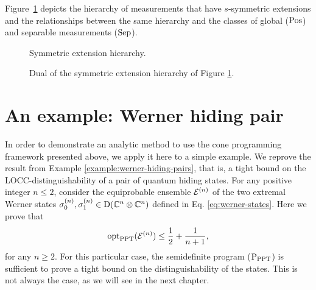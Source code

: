 Figure~\ref{fig:symm-extension} depicts the hierarchy of measurements that have
$s$-symmetric extensions and the relationships between the same hierarchy
and the classes of global ($\mathrm{Pos}$) and separable measurements ($\mathrm{Sep}$). 

\begin{figure}[!htbp]
  \centering
    \def\svgwidth{200pt}
    \scalebox{.85}{
    }
    \caption{Symmetric extension hierarchy.}
    \label{fig:symm-extension}
\end{figure}

\begin{figure}[!htbp]
  \centering
    \def\svgwidth{200pt}
    \scalebox{.85}{
    }
    \caption{Dual of the symmetric extension hierarchy of Figure \ref{fig:symm-extension}.}
    \label{fig:symm-extension-dual}
\end{figure}

\section{An example: Werner hiding pair}

In order to demonstrate an analytic method to use the cone programming framework
presented above, we apply it here to a simple example. 
We reprove the result from Example \ref{example:werner-hiding-pairs},
that is, a tight bound on the LOCC-distinguishability of a pair of quantum hiding states.
For any positive integer $n \leq 2$, consider the equiprobable ensemble $\mathcal{E}^{(n)}$ of 
the two extremal Werner states
$\sigma_{0}^{(n)}, \sigma_{1}^{(n)} \in \mathrm{D}(\mathbb{C}^{n}\otimes\mathbb{C}^{n})$
defined in Eq. \eqref{eq:werner-states}.
Here we prove that
\begin{equation}
  \operatorname{opt}_{\mathrm{PPT}}(\mathcal{E}^{(n)}) \leq \frac{1}{2} + \frac{1}{n+1},
\end{equation}
for any $n \geq 2$.
For this particular case, the semidefinite program ($\textup{P}_{\mathrm{PPT}}$) is 
sufficient to prove a tight bound on the distinguishability of the states.
This is not always the case, as we will see in the next chapter.

